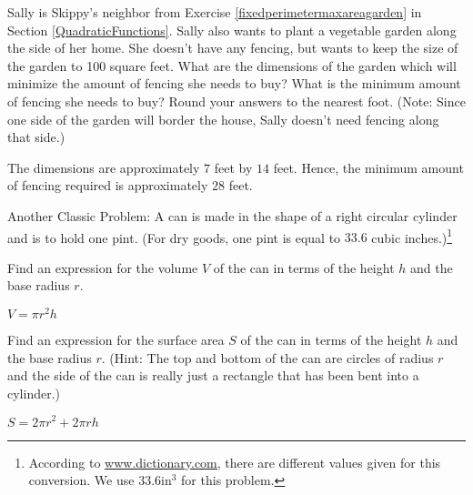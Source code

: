 \documentclass{ximera}
\begin{document}
\begin{question}
Sally is Skippy's neighbor from Exercise \ref{fixedperimetermaxareagarden} in Section \ref{QuadraticFunctions}.   Sally also wants to plant a vegetable garden along the side of her home.  She doesn't have any fencing, but wants to keep the size of the garden to 100 square feet.  What are the dimensions of the garden which will minimize the amount of fencing she needs to buy?  What is the minimum amount of fencing she needs to buy? Round your answers to the nearest foot. (Note:  Since one side of the garden will border the house, Sally doesn't need fencing along that side.)
\begin{solution}
The dimensions are  approximately  $7$ feet by $14$ feet.  Hence, the minimum amount of fencing required is approximately  $28$ feet.
\end{solution}

\end{question}

\begin{question}
Another Classic Problem: A can is made in the shape of a right circular cylinder and is to hold one pint. (For dry goods, one pint is equal to $33.6$ cubic inches.)\footnote{According to \href{http://dictionary.reference.com/browse/pint}{\underline{www.dictionary.com}}, there are different values given for this conversion. We use $33.6 \text{in}^{3}$ for this problem.}  

\begin{solution}
\end{solution}

\end{question}

\begin{question}
Find an expression for the volume $V$ of the can in terms of the height $h$ and the base radius $r$.
\begin{solution}
$V = \pi r^{2}h$
\end{solution}

\end{question}

\begin{question}
Find an expression for the surface area $S$ of the can in terms of the height $h$ and the base radius $r$.  (Hint: The top and bottom of the can are circles of radius $r$ and the side of the can is really just a rectangle that has been bent into a cylinder.)
\begin{solution}
$S = 2 \pi r^{2} + 2\pi r h$

\end{solution}

\end{question}
\end{document}
